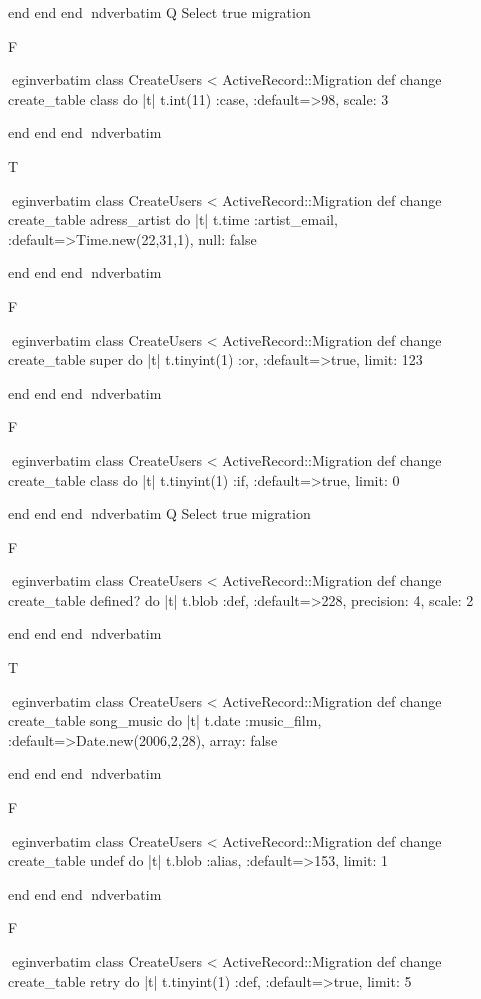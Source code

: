     end 
  end 
end
nd{verbatim}
Q
 Select true migration

F

egin{verbatim}
 class CreateUsers < ActiveRecord::Migration 
  def change 
    create_table class do |t| 
      t.int(11) :case, :default=>98, scale: 3
    
    end 
  end 
end
nd{verbatim}

T

egin{verbatim}
 class CreateUsers < ActiveRecord::Migration 
  def change 
    create_table adress_artist do |t| 
      t.time :artist_email, :default=>Time.new(22,31,1), null: false
    
    end 
  end 
end
nd{verbatim}

F

egin{verbatim}
 class CreateUsers < ActiveRecord::Migration 
  def change 
    create_table super do |t| 
      t.tinyint(1) :or, :default=>true, limit: 123
    
    end 
  end 
end
nd{verbatim}

F

egin{verbatim}
 class CreateUsers < ActiveRecord::Migration 
  def change 
    create_table class do |t| 
      t.tinyint(1) :if, :default=>true, limit: 0
    
    end 
  end 
end
nd{verbatim}
Q
 Select true migration

F

egin{verbatim}
 class CreateUsers < ActiveRecord::Migration 
  def change 
    create_table defined? do |t| 
      t.blob :def, :default=>228, precision: 4, scale: 2
    
    end 
  end 
end
nd{verbatim}

T

egin{verbatim}
 class CreateUsers < ActiveRecord::Migration 
  def change 
    create_table song_music do |t| 
      t.date :music_film, :default=>Date.new(2006,2,28), array: false
    
    end 
  end 
end
nd{verbatim}

F

egin{verbatim}
 class CreateUsers < ActiveRecord::Migration 
  def change 
    create_table undef do |t| 
      t.blob :alias, :default=>153, limit: 1
    
    end 
  end 
end
nd{verbatim}

F

egin{verbatim}
 class CreateUsers < ActiveRecord::Migration 
  def change 
    create_table retry do |t| 
      t.tinyint(1) :def, :default=>true, limit: 5
    
